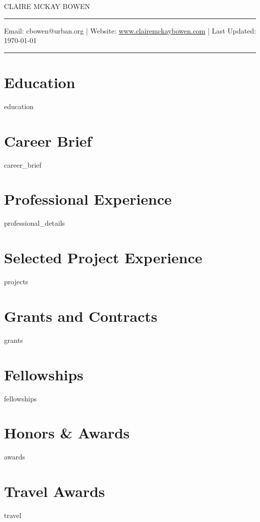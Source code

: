 \documentclass[11pt, letterpaper, roman]{moderncv} %
\begin{document}
\vspace{-10pt}
\centerline{\huge{CLAIRE MCKAY BOWEN}}
\vspace{10pt}
\hrule
\vspace{5pt}
\centerline{\small Email: cbowen@urban.org | Website: \href{https://www.clairemckaybowen.com}{www.clairemckaybowen.com} | Last Updated: \today}
\vspace{5pt}
\hrule

\section{Education}
{education}

\section{Career Brief}
{career_brief}

\section{Professional Experience}
{professional_details}

\section{Selected Project Experience}
{projects}
    
\section{Grants and Contracts}
{grants}

\section{Fellowships}
{fellowships}

\section{Honors \& Awards}
{awards}

\section{Travel Awards}
{travel}
    
\end{document}

